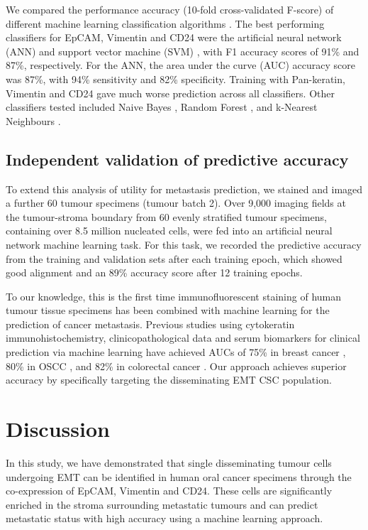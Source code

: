 \documentclass[11pt]{article}
\begin{document}
We compared the performance accuracy (10-fold cross-validated F-score) of different machine learning classification algorithms \citep{pedregosa2011}. The best performing classifiers for EpCAM, Vimentin and CD24 were the artificial neural network (ANN) \citep{rumelhart1986} and support vector machine (SVM) \citep{smola2004}, with F1 accuracy scores of 91\% and 87\%, respectively. For the ANN, the area under the curve (AUC) accuracy score was 87\%, with 94\% sensitivity and 82\% specificity. Training with Pan-keratin, Vimentin and CD24 gave much worse prediction across all classifiers. Other classifiers tested included Naive Bayes \citep{zhang2005}, Random Forest \citep{dumont2009}, and k-Nearest Neighbours \citep{bentley1975}.

\subsection{Independent validation of predictive accuracy}

To extend this analysis of utility for metastasis prediction, we stained and imaged a further 60 tumour specimens (tumour batch 2). Over 9,000 imaging fields at the tumour-stroma boundary from 60 evenly stratified tumour specimens, containing over 8.5 million nucleated cells, were fed into an artificial neural network machine learning task. For this task, we recorded the predictive accuracy from the training and validation sets after each training epoch, which showed good alignment and an 89\% accuracy score after 12 training epochs.

To our knowledge, this is the first time immunofluorescent staining of human tumour tissue specimens has been combined with machine learning for the prediction of cancer metastasis. Previous studies using cytokeratin immunohistochemistry, clinicopathological data and serum biomarkers for clinical prediction via machine learning have achieved AUCs of 75\% in breast cancer \citep{tseng2019}, 80\% in OSCC \citep{bur2019}, and 82\% in colorectal cancer \citep{takamatsu2019}. Our approach achieves superior accuracy by specifically targeting the disseminating EMT CSC population.

\section{Discussion}

In this study, we have demonstrated that single disseminating tumour cells undergoing EMT can be identified in human oral cancer specimens through the co-expression of EpCAM, Vimentin and CD24. These cells are significantly enriched in the stroma surrounding metastatic tumours and can predict metastatic status with high accuracy using a machine learning approach.
\end{document}
